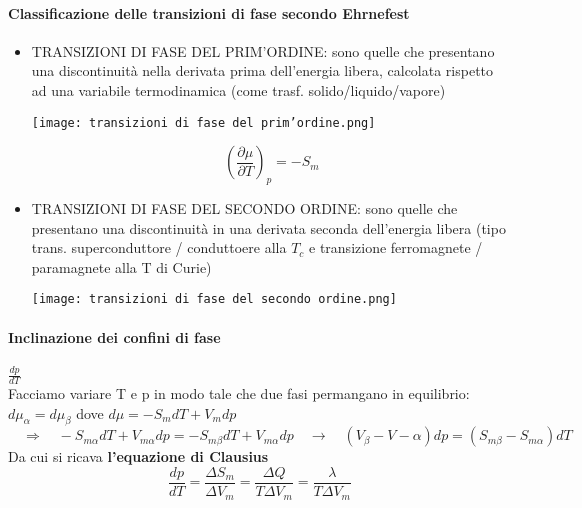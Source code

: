 \documentclass{article}
\newcommand{\so}{\quad \rightarrow \quad}
\newcommand{\So}{\quad \Rightarrow \quad}
\begin{document}
\paragraph{Classificazione delle transizioni di fase secondo Ehrnefest}
\begin{itemize}
    \item TRANSIZIONI DI FASE DEL PRIM'ORDINE: sono quelle che presentano una discontinuità nella derivata prima dell'energia libera, calcolata rispetto ad una variabile termodinamica (come trasf. solido/liquido/vapore)
    \begin{center}
        \texttt{[image: transizioni di fase del prim'ordine.png]}
    \end{center}
    \begin{equation*}
        (\frac{\partial \mu}{\partial T})_p=-S_m
    \end{equation*}
    \item TRANSIZIONI DI FASE DEL SECONDO ORDINE: sono quelle che presentano una discontinuità in una derivata seconda dell'energia libera (tipo trans. superconduttore / conduttoere alla $T_c$ e transizione ferromagnete / paramagnete alla T di Curie)
    \begin{center}
        \texttt{[image: transizioni di fase del secondo ordine.png]}
    \end{center}
\end{itemize}

\paragraph{Inclinazione dei confini di fase} $\frac{dp}{dT}$
\\Facciamo variare T e p in modo tale che due fasi permangano in equilibrio:
\\ $d\mu_\alpha=d\mu_\beta$ dove $d\mu=-S_mdT+V_mdp$
\begin{equation*}
    \So -S_{m\alpha}dT+V_{m\alpha}dp=-S_{m\beta}dT+V_{m\alpha}dp \so (V_\beta-V-\alpha)dp=(S_{m\beta}-S_{m\alpha})dT
\end{equation*}
Da cui si ricava \textbf{l'equazione di Clausius}
\begin{equation*}
    \frac{dp}{dT}=\frac{\Delta S_m}{\Delta V_m}=\frac{\Delta Q}{T\Delta V_m}=\frac{\lambda}{T\Delta V_m}
\end{equation*}
\end{document}
